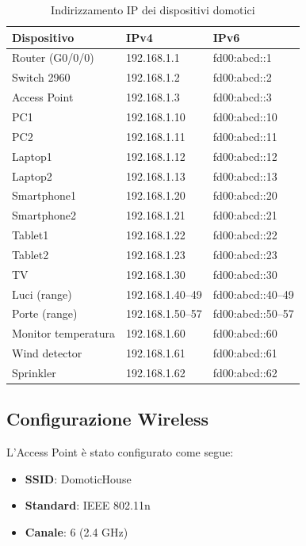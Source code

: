 \documentclass[a4paper,12pt]{article}
\begin{document}
\begin{table}[H]
\centering
\begin{tabular}{|l|l|l|}
\hline
\textbf{Dispositivo} & \textbf{IPv4} & \textbf{IPv6} \\
\hline
Router (G0/0/0) & 192.168.1.1 & fd00:abcd::1 \\
Switch 2960 & 192.168.1.2 & fd00:abcd::2 \\
Access Point & 192.168.1.3 & fd00:abcd::3 \\
PC1 & 192.168.1.10 & fd00:abcd::10 \\
PC2 & 192.168.1.11 & fd00:abcd::11 \\
Laptop1 & 192.168.1.12 & fd00:abcd::12 \\
Laptop2 & 192.168.1.13 & fd00:abcd::13 \\
Smartphone1 & 192.168.1.20 & fd00:abcd::20 \\
Smartphone2 & 192.168.1.21 & fd00:abcd::21 \\
Tablet1 & 192.168.1.22 & fd00:abcd::22 \\
Tablet2 & 192.168.1.23 & fd00:abcd::23 \\
TV & 192.168.1.30 & fd00:abcd::30 \\
Luci (range) & 192.168.1.40–49 & fd00:abcd::40–49 \\
Porte (range) & 192.168.1.50–57 & fd00:abcd::50–57 \\
Monitor temperatura & 192.168.1.60 & fd00:abcd::60 \\
Wind detector & 192.168.1.61 & fd00:abcd::61 \\
Sprinkler & 192.168.1.62 & fd00:abcd::62 \\
\hline
\end{tabular}
\caption{Indirizzamento IP dei dispositivi domotici}
\end{table}

\subsection{Configurazione Wireless}

L’Access Point è stato configurato come segue:

\begin{itemize}
    \item \textbf{SSID}: DomoticHouse
    \item \textbf{Standard}: IEEE 802.11n
    \item \textbf{Canale}: 6 (2.4 GHz)
\end{itemize}
\end{document}
